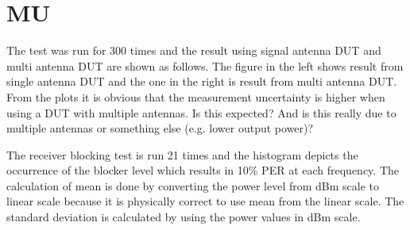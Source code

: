 \section{\acf{MU}}
The test was run for 300 times and the result using signal antenna DUT and multi antenna DUT are shown as follows. The figure in the left shows result from single antenna DUT and the one in the right is result from multi antenna DUT.
From the plots it is obvious that the measurement uncertainty is higher when using a DUT with multiple antennas. Is this expected? And is this really due to multiple antennas or something else (e.g. lower output power)?




The receiver blocking test is run 21 times and the histogram depicts the occurrence of the blocker level which results in 10\% PER at each frequency. The calculation of mean is done by converting the power level from dBm scale to linear scale because it is physically correct to use mean from the linear scale. The standard deviation is calculated by using the power values in dBm scale. 